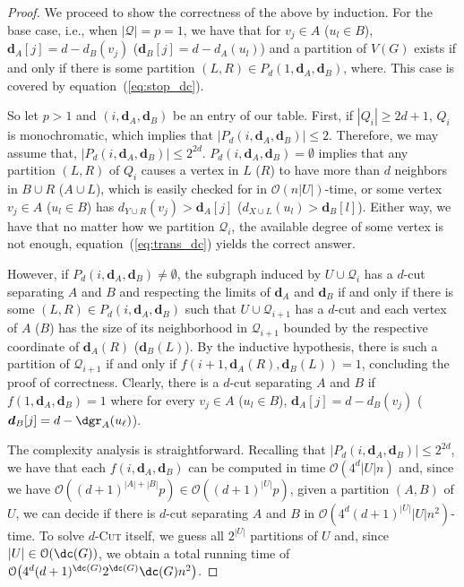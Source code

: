 \documentclass[a4paper,UKenglish,cleveref, autoref]{lipics-v2019}
\newcommand{\bmd}{\boldsymbol{d}}
\newcommand{\bigO}[1]{\mathcal{O}\!\left(#1\right)}
\newcommand{\pname}[1]{\textsc{#1}}
\begin{document}
\begin{proof}
    We proceed to show the correctness of the above by induction.
    For the base case, i.e., when $|\mathcal{Q}| = p = 1$, we have that for $v_j \in A$ ($u_l \in B$),  $\bmd_A[j] = d - d_B(v_j)$ ($\bmd_B[j] = d - d_A(u_l)$) and a partition of $V(G)$ exists if and only if there is some partition $(L, R) \in P_d(1, \bmd_A, \bmd_B)$, where.
    This case is covered by equation~(\ref{eq:stop_dc}).

    So let $p > 1$ and $(i, \bmd_A, \bmd_B)$ be an entry of our table.
    First, if $|Q_i| \geq 2d+1$, $Q_i$ is monochromatic, which implies that $|P_d(i, \bmd_A, \bmd_B)| \leq 2$.
    Therefore, we may assume that, $|P_d(i, \bmd_A, \bmd_B)| \leq 2^{2d}$.
    $P_d(i, \bmd_A, \bmd_B) = \emptyset$ implies that any partition $(L, R)$ of $Q_i$ causes a vertex in $L$ ($R$) to have more than $d$ neighbors in $B \cup R$ ($A \cup L$), which is easily checked for in $\bigO{n|U|}$-time, or some vertex $v_j \in A$ ($u_l \in B$) has $d_{Y \cup R}(v_j) > \bmd_A[j]$ ($d_{X \cup L}(u_l) > \bmd_B[l]$).
    Either way, we have that no matter how we partition $\mathcal{Q}_i$, the available degree of some vertex is not enough, equation~(\ref{eq:trans_dc}) yields the correct answer.

    However, if $P_d(i, \bmd_A, \bmd_B) \neq \emptyset$, the subgraph induced by $U \cup \mathcal{Q}_i$ has a $d$-cut separating $A$ and $B$ and respecting the limits of $\bmd_A$ and $\bmd_B$ if and only if there is some $(L, R) \in P_d(i, \bmd_A, \bmd_B)$ such that $U \cup \mathcal{Q}_{i+1}$ has a $d$-cut and each vertex of $A$ ($B$) has the size of its neighborhood in $\mathcal{Q}_{i+1}$ bounded by the respective coordinate of $\bmd_A(R)$ ($\bmd_B(L)$).
    By the inductive hypothesis, there is such a partition of $\mathcal{Q}_{i+1}$ if and only if $f(i+1, \bmd_A(R), \bmd_B(L)) = 1$, concluding the proof of correctness.
    Clearly, there is a $d$-cut separating $A$ and $B$ if $f(1, \bmd_A, \bmd_B) = 1$ where for every $v_j \in A$ ($u_l \in B$),  $\bmd_A[j] = d - d_B(v_j)$ ($\bmd_B[j] = d - \dgr_A(u_{\ell})$).

    The complexity analysis is straightforward.
    Recalling that $|P_d(i, \bmd_A, \bmd_B)| \leq 2^{2d}$, we have that each $f(i, \bmd_A, \bmd_B)$ can be computed in time $\bigO{4^d|U|n}$ and, since we have $\bigO{(d+1)^{|A| + |B|}p} \in \bigO{(d+1)^{|U|}p}$, given a partition $(A, B)$ of $U$, we can decide if there is $d$-cut separating $A$ and $B$ in $\bigO{4^d(d+1)^{|U|}|U|n^2}$-time.
    To solve \pname{$d$-Cut} itself, we guess all $2^{|U|}$ partitions of $U$ and, since $|U| \in \bigO{\dc(G)}$, we obtain a total running time of $\bigO{4^d(d+1)^{\dc(G)}2^{\dc(G)}\dc(G)n^2}$.
\end{proof}
\end{document}
